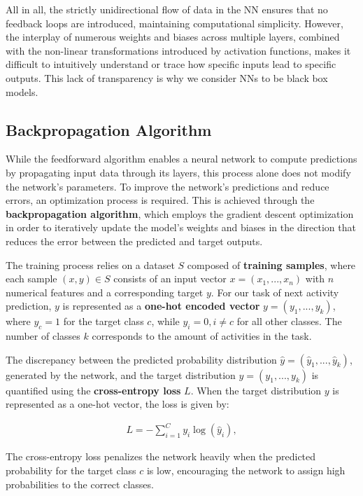 All in all, the strictly unidirectional flow of data in the NN
ensures that no feedback loops are introduced, maintaining computational simplicity.
However, the interplay of numerous weights and biases across multiple layers,
combined with the non-linear transformations introduced by activation functions,
makes it difficult to intuitively understand or trace how specific inputs lead to specific outputs.
This lack of transparency is why we consider NNs to be black box models.

\subsection{Backpropagation Algorithm}
\label{sec:backpropagation}
While the feedforward algorithm enables a neural network to compute predictions
by propagating input data through its layers,
this process alone does not modify the network's parameters.
To improve the network's predictions and reduce errors,
an optimization process is required.
This is achieved through the \textbf{backpropagation algorithm},
which employs the gradient descent optimization in order to
iteratively update the model's weights and biases in the direction that reduces the error
between the predicted and target outputs.

The training process relies on a dataset $S$ composed of \textbf{training samples},
where each sample $(x,y) \in S$ consists of an input vector $x=(x_1,...,x_n)$ with $n$ numerical features
and a corresponding target $y$.
For our task of next activity prediction,
$y$ is represented as a \textbf{one-hot encoded vector} $y = (y_1, ..., y_k)$,
where $y_c = 1$ for the target class $c$, while $y_i = 0, i \neq c$ for all other classes.
The number of classes $k$ corresponds to the amount of activities in the task.

The discrepancy between the predicted probability distribution $\hat{y} = (\hat{y}_1, ..., \hat{y}_k)$,
generated by the network, and the target distribution $y = (y_1, ..., y_k)$
is quantified using the \textbf{cross-entropy loss} $L$.
When the target distribution $y$ is represented as a one-hot vector, the loss is given by:

\begin{align} L = - \sum_{i=1}^C y_i \log(\hat{y}_i), \end{align}

The cross-entropy loss penalizes the network heavily when the predicted probability for the target class $c$ is low,
encouraging the network to assign high probabilities to the correct classes.


